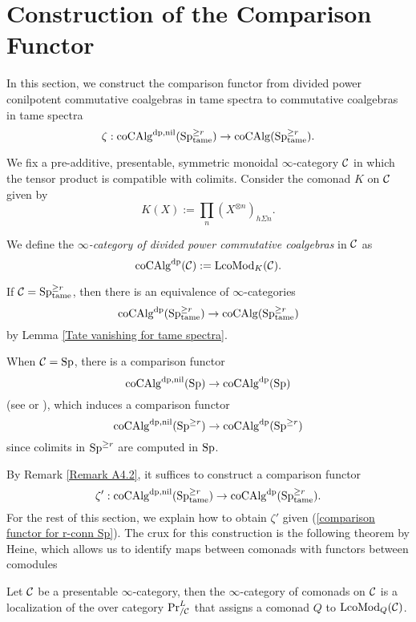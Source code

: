 \section{Construction of the Comparison Functor}
\label{Construction of the Comparison Functor}
In this section, we construct the comparison functor from divided power conilpotent commutative coalgebras in tame spectra to commutative coalgebras in tame spectra
$$
\zeta:\operatorname{coCAlg}^{\operatorname{dp},\operatorname{nil}}(\operatorname{Sp}^{\geq r}_{\operatorname{\operatorname{tame}}}) \to
\operatorname{coCAlg}(\operatorname{Sp}^{\geq r}_{\operatorname{\operatorname{tame}}}).
$$

We fix a pre-additive, presentable, symmetric monoidal $\infty$-category ${\mathcal{C}}$ in which the tensor product is compatible with colimits. 
Consider the comonad $K$ on ${\mathcal{C}}$ given by 
$$
K(X) := \prod_n (X^{\otimes n})_{h\Sigma n}.
$$
\begin{definition}
    We define the \emph{$\infty$-category of divided power commutative coalgebras} in ${\mathcal{C}}$ as 
$$
\operatorname{coCAlg}^{\operatorname{dp}}({\mathcal{C}}):= \operatorname{LcoMod}_{K}({\mathcal{C}}).
$$
\end{definition}
\begin{remark}
\label{Remark A4.2}
If ${\mathcal{C}}=\operatorname{Sp}^{\geq r}_{\operatorname{\operatorname{tame}}}$, then there is an equivalence of $\infty$-categories 
$$
\operatorname{coCAlg}^{\operatorname{dp}}(\operatorname{Sp}^{\geq r}_{\operatorname{\operatorname{tame}}})
\to 
\operatorname{coCAlg}(\operatorname{Sp}^{\geq r}_{\operatorname{\operatorname{tame}}})
$$
by Lemma \ref{Tate vanishing for tame spectra}.
\end{remark}

\begin{remark}
\label{Remark A4.3}
When ${\mathcal{C}}=\operatorname{Sp}$, there is a comparison functor
$$
\operatorname{coCAlg}^{\operatorname{dp}, \operatorname{nil}}(\operatorname{Sp}) \to  \operatorname{coCAlg}^{\operatorname{dp}}(\operatorname{Sp})
$$
(see \cite[Section 3.5]{Francis-Gaitsgory} or \cite{Heuts_Koszul}), which induces a comparison functor
\begin{equation}
\label{comparison functor for r-conn Sp}
    \operatorname{coCAlg}^{\operatorname{dp}, \operatorname{nil}}(\operatorname{Sp}^{\geq r}) \to  \operatorname{coCAlg}^{\operatorname{dp}}(\operatorname{Sp}^{\geq r})
\end{equation}
since colimits in $\operatorname{Sp}^{\geq r}$ are computed in $\operatorname{Sp}$.
\end{remark}

By Remark \ref{Remark A4.2}, it suffices to construct a comparison functor
$$
\zeta':\operatorname{coCAlg}^{\operatorname{dp}, \operatorname{nil}}(\operatorname{Sp}^{\geq r}_{\operatorname{\operatorname{tame}}})
\to 
\operatorname{coCAlg}^{\operatorname{dp}}(\operatorname{Sp}^{\geq r}_{\operatorname{\operatorname{tame}}}).
$$
For the rest of this section, we explain how to obtain $\zeta'$ given (\ref{comparison functor for r-conn Sp}).
The crux for this construction is the following theorem by Heine, which allows us to identify maps between comonads with functors between comodules
\begin{theorem}
\label{Monads-Alg correspondence}
\cite[Theorem 5.1]{Heine_Monads}
Let ${\mathcal{C}}$ be a presentable $\infty$-category, then the $\infty$-category of comonads on ${\mathcal{C}}$ is a localization of the over category $\Pr^{L}_{/{\mathcal{C}}}$ that assigns a comonad $Q$ to $\operatorname{LcoMod}_{Q}({\mathcal{C}})$.
\end{theorem}


